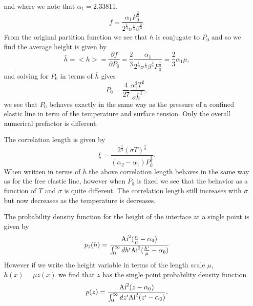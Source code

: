 and where we note that $\alpha_1 = 2.33811$.
\begin{equation}
    f= \frac{\alpha_1 P_0^\frac{2}{3}}{2^\frac{1}{3} \sigma^\frac{1}{3}\beta^\frac{2}{3}}.
\end{equation}
From the original partition function we see that $h$ is conjugate to $P_0$ and so we find the average height is given by
\begin{equation}
    \bar h= < h> = \frac{\partial f}{\partial P_0} = \frac{2}{3}\frac{\alpha_1 }{2^\frac{1}{3} \sigma^\frac{1}{3}\beta^\frac{2}{3}P_0^\frac{1}{3}} = \frac{2}{3}\alpha_1\mu,\label{h1}
\end{equation}
and solving for $P_0$ in terms of $\overline h$ gives
\begin{equation}
    P_0 = \frac{4}{27}\frac{\alpha_1^3 T^2}{\sigma \overline h^3},
\end{equation}
we see that $P_0$ behaves exactly in the same way as the pressure of a confined elastic line
in term of the temperature and surface tension. Only the overall numerical prefactor is different.

The correlation length is given by
\begin{equation}
    \xi = \frac{2^\frac{1}{3}(\sigma T)^\frac{1}{3}}{(\alpha_2-\alpha_1)P_0^\frac{2}{3}}.
\end{equation}
When written in terms of $\overline h$ the above correlation length behaves in the same way
as for the free elastic line, however when $P_0$ is fixed we see that the behavior as a function 
of $T$ and $\sigma$ is quite different. The correlation length still increases with $\sigma$ but now decreases as the temperature is decreases.

The probability density function for the height of the interface at a single point is given
by
\begin{equation}
    p_1(h) = \frac{{\rm Ai}^2(\frac{h}{\mu}-\alpha_0)}{\int_0^\infty dh' {\rm Ai}^2(\frac{h'}{\mu}-\alpha_0)}
\end{equation}
However if we write the height variable in terms of the length scale $\mu$, $h(x)= \mu z(x)$ we find that $z$ has the single point probability density function
\begin{equation}
    p(z)= \frac{{\rm Ai}^2(z-\alpha_0)}{\int_0^\infty dz' {\rm Ai}^2(z'-\alpha_0)}.
\end{equation}

